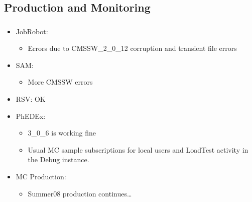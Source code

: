 \documentclass{beamer}
\begin{document}
\subsection{Production and Monitoring}
\begin{frame}
\frametitle{}
\begin{itemize}
     \item JobRobot:
     \begin{itemize}
        \item Errors due to CMSSW\_2\_0\_12 corruption and transient file errors
     \end{itemize}
     \item SAM:
     \begin{itemize}
        \item More CMSSW errors
     \end{itemize}
     \item RSV: OK
     \item PhEDEx:
     \begin{itemize}
        \item 3\_0\_6 is working fine
        \item Usual MC sample subscriptions for local users and LoadTest activity in the Debug instance.
     \end{itemize}
     \item MC Production:
     \begin{itemize}
        \item Summer08 production continues\ldots{}
     \end{itemize}
\end{itemize}
\end{frame}
\end{document}
